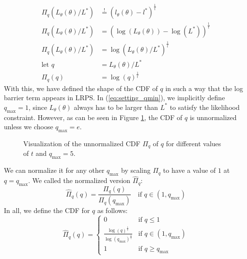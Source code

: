 \documentclass[12pt, a4paper]{report}
\begin{document}
\begin{align}
    \Pi_q(L_\theta(\theta) / L^*) &\overset{!}{=} (l_\theta(\theta) - l^*)^{\frac{1}{t}}  \nonumber\\
    \Pi_q(L_\theta(\theta) / L^*) &=(\log(L_\theta(\theta)) - \log(L^*))^{\frac{1}{t}} \nonumber\\
    \Pi_q(L_\theta(\theta) / L^*) &= \log(L_\theta(\theta) / L^*)^{\frac{1}{t}} \nonumber\\
    \textrm{let } q &= L_\theta(\theta) / L^* \label{eq:setting_qmin}\\
    \Pi_q(q) &= \log(q)^{\frac{1}{t}} \nonumber
\end{align}
With this, we have defined the shape of the CDF of $q$ in such a way that the log barrier term appears in LRPS.
In (\ref{eq:setting_qmin}), we implicitly define $q_{\textrm{max}} = 1$, since $L_\theta(\theta)$ always has to be larger than $L^*$ to satisfy the likelihood constraint.
However, as can be seen in Figure \ref{fig:unnormalized}, the CDF of $q$ is unnormalized unless we choose $q_{\textrm{max}}=e$.

\begin{figure}
    \centering
    \caption{Visualization of the unnormalized CDF $\Pi_q$ of $q$ for different values of $t$ and $q_{\textrm{max}}=5$.}
    \label{fig:unnormalized}
\end{figure}

We can normalize it for any other $q_{\textrm{max}}$ by scaling $\Pi_q$ to have a value of $1$ at $q=q_{\textrm{max}}$.
We called the normalized version $\hat{\Pi}_q$:
$$
\hat{\Pi}_q(q) = \frac{\Pi_q(q)}{\Pi_q(q_{\textrm{max}})} \quad \textrm{if } q \in (1, q_{\textrm{max}})
$$
In all, we define the CDF for $q$ as follows:
$$
\hat{\Pi}_q(q) = 
\begin{cases}
    0 & \text{if } q \leq 1 \\
    \frac{\log(q)^\frac{1}{t}}{\log(q_{\textrm{max}})^\frac{1}{t}} & \text{if } q \in (1, q_{\textrm{max}})\\
    1 & \text{if } q \geq q_{\textrm{max}}
\end{cases}
$$
\end{document}
